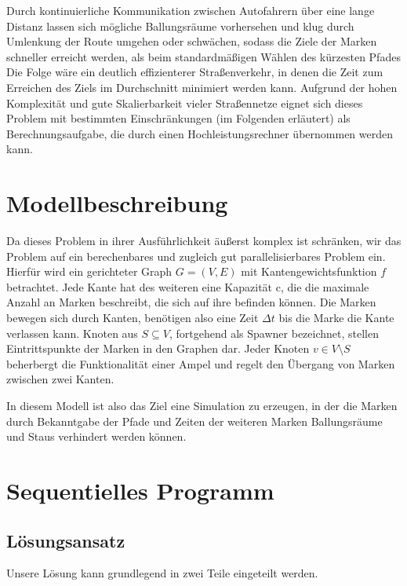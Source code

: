 \documentclass[paper=A4,pagesize=auto,12pt,headinclude=true,footinclude=true,BCOR=0mm,DIV=calc]{scrartcl}
\begin{document}
	Durch kontinuierliche Kommunikation zwischen Autofahrern über eine lange Distanz lassen sich mögliche Ballungsräume vorhersehen und klug durch Umlenkung der Route umgehen oder schwächen, sodass die Ziele der Marken schneller erreicht werden, als beim standardmäßigen Wählen des kürzesten Pfades
	Die Folge wäre ein deutlich effizienterer Straßenverkehr, in denen die Zeit zum Erreichen des Ziels im Durchschnitt minimiert werden kann. Aufgrund der hohen Komplexität und gute Skalierbarkeit vieler Straßennetze eignet sich dieses Problem mit bestimmten Einschränkungen (im Folgenden erläutert) als Berechnungsaufgabe, die durch einen Hochleistungsrechner übernommen werden kann.
	
	\section{Modellbeschreibung}
	Da dieses Problem in ihrer Ausführlichkeit äußerst komplex ist schränken, wir das Problem auf ein berechenbares und zugleich gut parallelisierbares Problem ein. 
	Hierfür wird ein gerichteter Graph $G = (V,E)$ mit Kantengewichtsfunktion $f$ betrachtet. Jede Kante hat des weiteren eine Kapazität c, die die maximale Anzahl an Marken beschreibt, die sich auf ihre befinden können. Die Marken bewegen sich durch Kanten, benötigen also eine Zeit $\Delta t$ bis die Marke die Kante verlassen kann. Knoten aus $S \subseteq V$, fortgehend als Spawner bezeichnet, stellen Eintrittspunkte der Marken in den Graphen dar. Jeder Knoten $v \in V \setminus S$ beherbergt die Funktionalität einer Ampel und regelt den Übergang von Marken zwischen zwei Kanten.
	
	In diesem Modell ist also das Ziel eine Simulation zu erzeugen, in der die Marken durch Bekanntgabe der Pfade und Zeiten der weiteren Marken Ballungsräume und Staus verhindert werden können.
	
	\section{Sequentielles Programm}
	
	\subsection{Lösungsansatz}
	Unsere Lösung kann grundlegend in zwei Teile eingeteilt werden.
	
\end{document}
